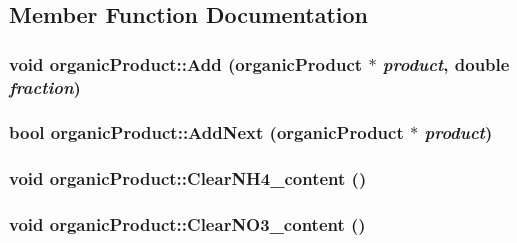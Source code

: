 \subsection{Member Function Documentation}
\hypertarget{classorganic_product_ab8e426e0ccc28b8e577d336f237bc956}{
\subsubsection[{Add}]{\setlength{\rightskip}{0pt plus 5cm}void organicProduct::Add ({\bf organicProduct} $\ast$ {\em product}, \/  double {\em fraction})}}
\label{classorganic_product_ab8e426e0ccc28b8e577d336f237bc956}
\hypertarget{classorganic_product_a19db425e68324fe376be404cb52d1ba6}{
\subsubsection[{AddNext}]{\setlength{\rightskip}{0pt plus 5cm}bool organicProduct::AddNext ({\bf organicProduct} $\ast$ {\em product})}}
\label{classorganic_product_a19db425e68324fe376be404cb52d1ba6}
\hypertarget{classorganic_product_a8717b1f12853806f7e4290e6df1db63d}{
\subsubsection[{ClearNH4\_\-content}]{\setlength{\rightskip}{0pt plus 5cm}void organicProduct::ClearNH4\_\-content ()}}
\label{classorganic_product_a8717b1f12853806f7e4290e6df1db63d}
\hypertarget{classorganic_product_a6068cca47d8fb9b69fa3f5ebdc4de374}{
\subsubsection[{ClearNO3\_\-content}]{\setlength{\rightskip}{0pt plus 5cm}void organicProduct::ClearNO3\_\-content ()}}
\label{classorganic_product_a6068cca47d8fb9b69fa3f5ebdc4de374}
